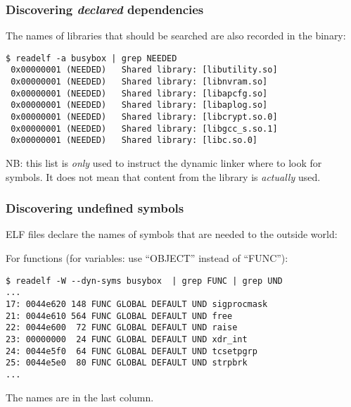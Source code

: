 \documentclass[11pt]{beamer}
\begin{document}
\begin{frame}[fragile]
\frametitle{Discovering \textit{declared} dependencies}
The names of libraries that should be searched are also recorded in the binary:

\begin{verbatim}
$ readelf -a busybox | grep NEEDED
 0x00000001 (NEEDED)   Shared library: [libutility.so]
 0x00000001 (NEEDED)   Shared library: [libnvram.so]
 0x00000001 (NEEDED)   Shared library: [libapcfg.so]
 0x00000001 (NEEDED)   Shared library: [libaplog.so]
 0x00000001 (NEEDED)   Shared library: [libcrypt.so.0]
 0x00000001 (NEEDED)   Shared library: [libgcc_s.so.1]
 0x00000001 (NEEDED)   Shared library: [libc.so.0]
\end{verbatim}

NB: this list is \textit{only} used to instruct the dynamic linker where to look for symbols. It does not mean that content from the library is \textit{actually} used.
\end{frame}


\begin{frame}[fragile]
\frametitle{Discovering undefined symbols}
ELF files declare the names of symbols that are needed to the outside world:

For functions (for variables:  use ``OBJECT'' instead of ``FUNC''):

\begin{verbatim}
$ readelf -W --dyn-syms busybox  | grep FUNC | grep UND
...
17: 0044e620 148 FUNC GLOBAL DEFAULT UND sigprocmask
21: 0044e610 564 FUNC GLOBAL DEFAULT UND free
22: 0044e600  72 FUNC GLOBAL DEFAULT UND raise
23: 00000000  24 FUNC GLOBAL DEFAULT UND xdr_int
24: 0044e5f0  64 FUNC GLOBAL DEFAULT UND tcsetpgrp
25: 0044e5e0  80 FUNC GLOBAL DEFAULT UND strpbrk
...
\end{verbatim}

The names are in the last column.
\end{frame}
\end{document}
